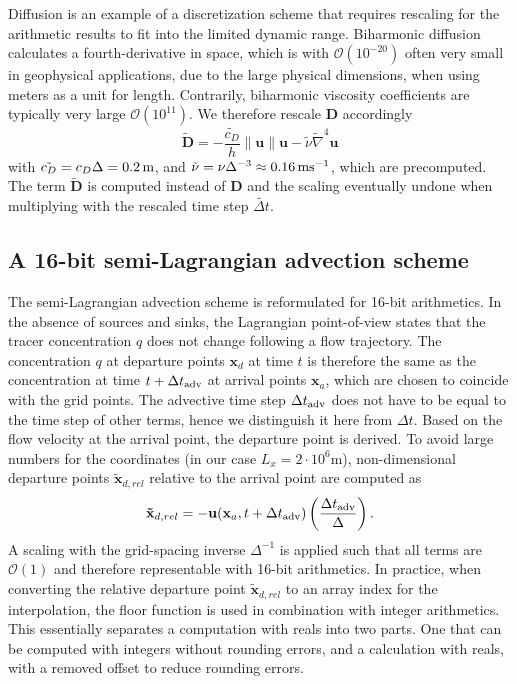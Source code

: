 Diffusion is an example of a discretization scheme that requires rescaling for the arithmetic results to fit into the limited dynamic range.
Biharmonic diffusion \citep{Griffies2000} calculates a fourth-derivative in space, which is with $\mathcal{O}(10^{-20})$ often very small in
geophysical applications, due to the large physical dimensions, when using meters as a unit for length. Contrarily, biharmonic viscosity
coefficients are typically very large
$\mathcal{O}(10^{11})$.
We therefore rescale $\mathbf{D}$ accordingly
\begin{equation}
\tilde{\mathbf{D}} =-\frac{\tilde{c_D}}{h}\| \mathbf{u} \| \mathbf{u} -
\tilde{\nu}\tilde{\nabla}^4\mathbf{u}
\end{equation}
with $\tilde{c_D} = c_D\Delta = 0.2\operatorname{m}$,  and $\tilde{\nu} = \nu\Delta^{-3}
\approx 0.16\operatorname{ms}^{-1}$, which are precomputed. The term
$\tilde{\mathbf{D}}$ is computed instead of $\mathbf{D}$ and the scaling eventually
undone when multiplying with the rescaled time step $\tilde{\Delta t}$.


\subsection{A 16-bit semi-Lagrangian advection scheme}
\label{sec:swm_semilagrange}

The semi-Lagrangian advection scheme is reformulated for 16-bit arithmetics. In the absence of sources and sinks,
the Lagrangian point-of-view states that the tracer concentration $q$ does not change following a flow trajectory.
The concentration $q$ at departure points $\mathbf{x}_d$ at time $t$ is therefore the same as the concentration at
time $t+\Delta t_{\operatorname{adv}}$ at arrival points $\mathbf{x}_a$, which are chosen to coincide with the grid points.
The advective time step $\Delta t_{\operatorname{adv}}$ does not have to be equal to the time step of other terms, hence we
distinguish it here from $\Delta t$. Based on the flow velocity at the arrival point, the departure point is derived. To avoid
large numbers for the coordinates (in our case $L_x = 2 \cdot 10^6$m), non-dimensional departure points
$\mathbf{\tilde{x}}_{d,rel}$ relative to the arrival point are computed as
\begin{equation}
\mathbf{\tilde{x}}_{d,rel} = - \mathbf{u}(\mathbf{x}_a,t+\Delta t_{\operatorname{adv}})
\left( \frac{\Delta t_{\operatorname{adv}}}{\Delta} \right).
\label{eq:relcoord}
\end{equation}
A scaling with the grid-spacing inverse $\Delta^{-1}$ is applied such that all terms are $\mathcal{O}(1)$ and therefore
representable with 16-bit arithmetics. In practice, when converting the relative departure point $\mathbf{\tilde{x}}_{d,rel}$
to an array index for the interpolation, the floor function is used in combination with integer arithmetics. This essentially
separates a computation with reals into two parts. One that can be computed with integers without rounding errors,
and a calculation with reals, with a removed offset to reduce rounding errors.

